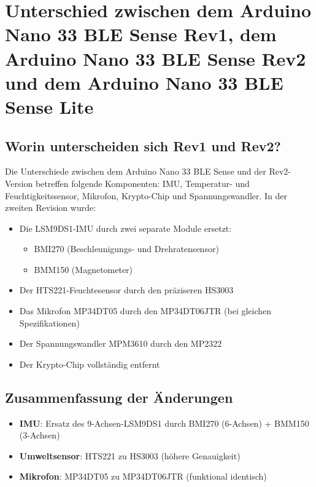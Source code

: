 \section{Unterschied zwischen dem Arduino Nano 33 BLE Sense Rev1, dem Arduino Nano 33 BLE Sense Rev2 und dem Arduino Nano 33 BLE Sense Lite}

\subsection{Worin unterscheiden sich Rev1 und Rev2?}

Die Unterschiede zwischen dem Arduino Nano 33 BLE Sense und der Rev2-Version betreffen folgende Komponenten: IMU, Temperatur- und Feuchtigkeitssensor, Mikrofon, Krypto-Chip und Spannungswandler. In der zweiten Revision wurde:

\begin{itemize}
	\item Die LSM9DS1-IMU durch zwei separate Module ersetzt:
	\begin{itemize}
		\item BMI270 (Beschleunigungs- und Drehratensensor)
		\item BMM150 (Magnetometer)
	\end{itemize}
	
	\item Der HTS221-Feuchtesensor durch den präziseren HS3003
	
	\item Das Mikrofon MP34DT05 durch den MP34DT06JTR (bei gleichen Spezifikationen)
	
	\item Der Spannungswandler MPM3610 durch den MP2322
	
	\item Der Krypto-Chip vollständig entfernt
	
\end{itemize}

\subsection*{Zusammenfassung der Änderungen}

\begin{itemize}
	\item \textbf{IMU}: Ersatz des 9-Achsen-LSM9DS1 durch BMI270 (6-Achsen) + BMM150 (3-Achsen)
	\item \textbf{Umweltsensor}: HTS221 zu HS3003 (höhere Genauigkeit)
	\item \textbf{Mikrofon}: MP34DT05 zu MP34DT06JTR (funktional identisch)
\end{itemize}


